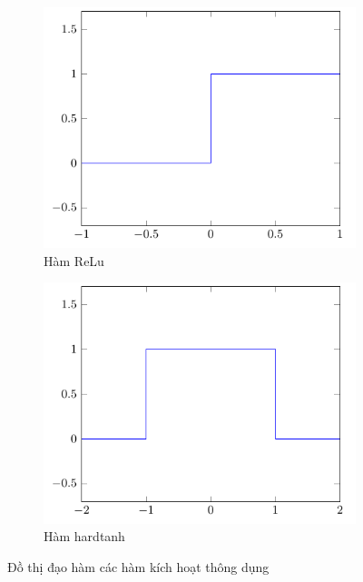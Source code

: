 \begin{figure}[htbp]
\begin{subfigure}[b]{0.33\textwidth}
        \centering
        \includegraphics[width=\textwidth]{tikz_image/diff_relu.pdf}
        \caption{Hàm ReLu}
    \end{subfigure}%
    \begin{subfigure}[b]{0.33\textwidth}
        \centering
        \includegraphics[width=\textwidth]{tikz_image/diff_hardtanh.pdf}
        \caption{Hàm hardtanh}
    \end{subfigure}%
    \caption{Đồ thị đạo hàm các hàm kích hoạt thông dụng}
    \label{figure:differential-activation-funtion}
\end{figure}

